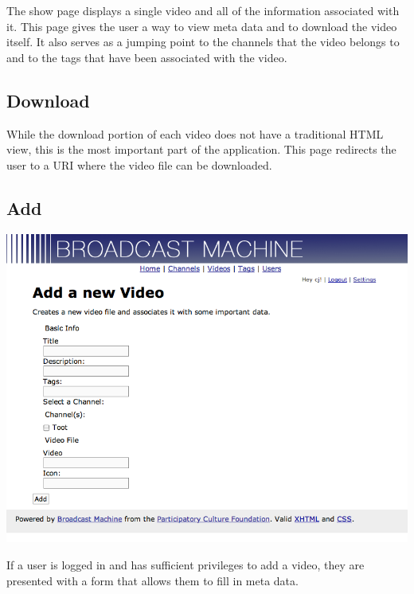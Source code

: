 \documentclass[a4paper,12pt]{report}
\begin{document}
The show page displays a single video and all of the information associated with it.
This page gives the user a way to view meta data and to download the video itself.
It also serves as a jumping point to the channels that the video belongs to and to the tags that have been associated with the video.

\subsection{Download}
While the download portion of each video does not have a traditional HTML view, this is the most important part of the application.
This page redirects the user to a URI where the video file can be downloaded.

\subsection{Add}
\includegraphics[width=150mm]{images/videoadd.png}

If a user is logged in and has sufficient privileges to add a video, they are presented with a form that allows them to fill in meta data.
\end{document}
